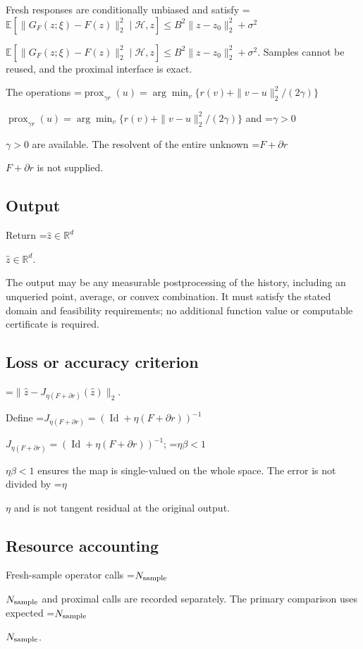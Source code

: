 \documentclass[10pt,a4paper]{article}
\newcommand{\AtlasMath}[1]{\par\begingroup\centering\setbox0=\hbox{$\displaystyle #1$}\ifdim\wd0>1.4\linewidth\typeout{ATLAS WIDE FORMULA: \the\wd0}\fi\ifdim\wd0>\linewidth\resizebox{\linewidth}{!}{\box0}\else\box0\fi\par\endgroup}
\newcommand{\AtlasInlineMath}[1]{\begingroup\setbox0=\hbox{$#1$}\ifdim\wd0>.4\linewidth\endgroup\AtlasMath{#1}\else\endgroup$#1$\fi}
\begin{document}
Fresh responses are conditionally unbiased and satisfy \AtlasInlineMath{\mathbb{E}[\|G_F(z;\xi)-F(z)\|_2^2\mid\mathcal{H},z]\le B^2\|z-z_0\|_2^2+\sigma^2}. Samples cannot be reused, and the proximal interface is exact.



The operations \AtlasInlineMath{\operatorname{prox}_{\gamma r}(u)=\arg\min_v\{r(v)+\|v-u\|_2^2/(2\gamma)\}} and \AtlasInlineMath{\gamma>0} are available. The resolvent of the entire unknown \AtlasInlineMath{F+\partial r} is not supplied.



\subsection{Output}


Return \AtlasInlineMath{\widehat{z}\in\mathbb{R}^d}.



The output may be any measurable postprocessing of the history, including an unqueried point, average, or convex combination. It must satisfy the stated domain and feasibility requirements; no additional function value or computable certificate is required.



\subsection{Loss or accuracy criterion}



\AtlasMath{\|\widehat{z}-J_{\eta(F+\partial r)}(\widehat{z})\|_2.}




Define \AtlasInlineMath{J_{\eta(F+\partial r)}=(\operatorname{Id}+\eta(F+\partial r))^{-1}}; \AtlasInlineMath{\eta\beta<1} ensures the map is single-valued on the whole space. The error is not divided by \AtlasInlineMath{\eta} and is not tangent residual at the original output.



\subsection{Resource accounting}


Fresh-sample operator calls \AtlasInlineMath{N_{\rm sample}} and proximal calls are recorded separately. The primary comparison uses expected \AtlasInlineMath{N_{\rm sample}}.
\end{document}
